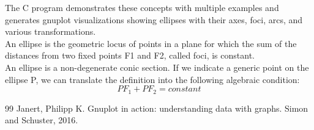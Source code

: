 \documentclass[a4paper,10pt]{article}
\begin{document}
The C program demonstrates these concepts with multiple examples and generates gnuplot visualizations showing ellipses with their axes, foci, arcs, and various transformations.\\
An ellipse is the geometric locus of points in a plane for which the sum of the distances from two fixed points F1 and F2, called foci, is constant.\\
An ellipse is a non-degenerate conic section. If we indicate a generic point on the ellipse P, we can translate the definition into the following algebraic condition:\\
\[ PF_1 + PF_2 = constant \]

\begin{thebibliography}{99}
 Janert, Philipp K. Gnuplot in action: understanding data with graphs. Simon and Schuster, 2016.
\end{thebibliography}
\end{document}
